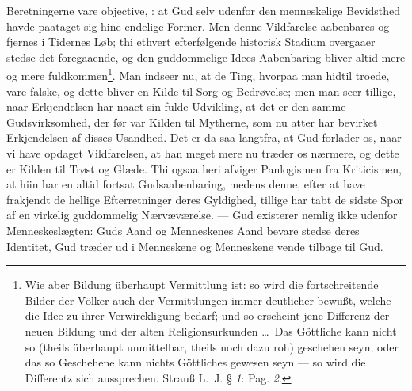 \documentclass[12pt]{book}
\newcommand{\dsi}{\reflectbox{c}:}
\newcommand{\opage}[1]{\marginnote{\footnotesize\textit{[#1]}}}
\begin{document}
Beretningerne vare objective, \dsi{} at Gud selv udenfor den menneskelige
Bevidsthed havde paataget sig hine endelige Former. Men denne Vildfarelse
aabenbares og fjernes i Tidernes Løb; thi ethvert efterfølgende historisk
Stadium overgaaer stedse det foregaaende, og den guddommelige Idees
Aabenbaring bliver altid mere og mere fuldkommen\footnote{Wie aber Bildung
überhaupt Vermittlung ist: so wird die fortschreitende Bilder der Völker auch
der Vermittlungen immer deutlicher bewußt, welche die Idee zu ihrer
Verwirckligung bedarf; und so erscheint jene Differenz der neuen Bildung und
der alten Religionsurkunden \ldots\ Das Göttliche kann nicht so (theils
überhaupt unmittelbar, theils noch dazu roh) geschehen seyn; oder das so
Geschehene kann nichts Göttliches gewesen seyn --- so wird die Differentz sich
aussprechen. Strauß L.~J. § \textit{1}: Pag. \textit{2}.}. Man indseer nu, at
de Ting, hvorpaa man hidtil troede, vare falske, og dette bliver en Kilde til
Sorg og Bedrøvelse; men man seer tillige, naar Erkjendelsen har naaet sin fulde
Udvikling, at det er den samme Gudsvirksomhed, der før var Kilden til
\opage{133} Mytherne, som nu atter har bevirket Erkjendelsen af disses Usandhed. Det er da
saa langtfra, at Gud forlader os, naar vi have opdaget Vildfarelsen, at han
meget mere nu træder os nærmere, og dette er Kilden til Trøst og Glæde. Thi
ogsaa heri afviger Panlogismen fra Kriticismen, at hiin har en altid fortsat
Gudsaabenbaring, medens denne, efter at have frakjendt de hellige Efterretninger
deres Gyldighed, tillige har tabt de sidste Spor af en virkelig guddommelig
Nærvæværelse. --- Gud existerer nemlig ikke udenfor Menneskeslægten: Guds Aand
og Menneskenes Aand bevare stedse deres Identitet, Gud træder ud i Menneskene og
Menneskene vende tilbage til Gud.
\end{document}
